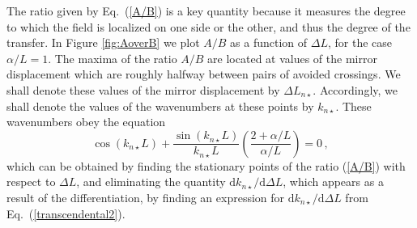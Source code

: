 \documentclass[twocolumn,english,pra,aps,superscriptaddress,floatfix]{revtex4-1}
\begin{document}
The ratio given by Eq.\ (\ref{A/B}) is a key quantity because it measures the degree to which the field is localized on one side or the other, and thus the degree of the transfer.
In Figure \ref{fig:AoverB} we plot $A/B$ as a function of $\Delta L$, for the case
$\alpha/L=1$.  The maxima of the ratio $A/B$ are located at values of the mirror displacement which are roughly halfway between pairs of avoided crossings. We shall denote these values of the mirror displacement by $\Delta L_{n \star}$.  Accordingly, we shall denote the values of the wavenumbers at these points by $k_{n \star}$. These wavenumbers obey the equation
\begin{equation}
\cos (k_{n \star} L)+ \frac{\sin(k_{n \star} L)}{k_{n \star} L}\left( \frac{2+\alpha/L}{\alpha/L} \right)=0 \, ,
\label{eq:knstartrancendental}
\end{equation}
which can be obtained by finding the stationary points of the ratio (\ref{A/B}) with respect to $\Delta L$, and eliminating the quantity $\mathrm{d} k_{n \star}/ \mathrm{d} \Delta L$, which appears as a result of the differentiation, by finding an expression for $\mathrm{d} k_{n \star}/ \mathrm{d} \Delta L$ from Eq.\ (\ref{transcendental2}).



\end{document}
